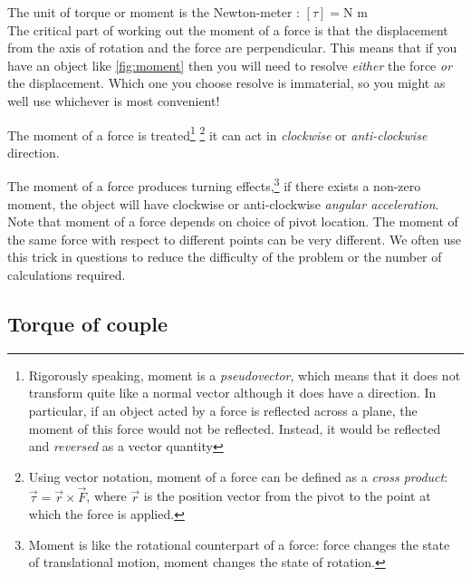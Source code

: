 The unit of torque or moment is the Newton-meter : $[\tau] = \text{N m}$\\

The critical part of working out the moment of a force is that the displacement from the axis of rotation and the force are perpendicular. This means that if you have an object like \ref{fig:moment} then you will need to resolve \emph{either} the force \emph{or} the displacement. Which one you choose resolve is immaterial, so you might as well use whichever is most convenient!\\

The moment of a force is treated\footnote{\piste Rigorously speaking, moment is a \emph{pseudovector}, which means that it does not transform quite like a normal vector although it does have a direction. In particular, if an object acted by a force is reflected across a plane, the moment of this force would not be reflected. Instead, it would be reflected and \emph{reversed} as a vector quantity}
\footnote[][]{\piste Using vector notation, moment of a force can be defined as a \emph{cross product}: $\overrightarrow{\tau} = \overrightarrow{r}\times\overrightarrow{F}$, where $\overrightarrow{r}$ is the position vector from the pivot to the point at which the force is applied.}
it can act in \emph{clockwise} or \emph{anti-clockwise} direction. 

The moment of a force produces turning effects,\footnote{Moment is like the rotational counterpart of a force: force changes the state of translational motion, moment changes the state of rotation.} if there exists a non-zero moment, the object will have clockwise or anti-clockwise \emph{angular acceleration}.\\
\titem Note that moment of a force depends on choice of pivot location. The moment of the same force with respect to different points can be very different. We often use this trick in questions to reduce the difficulty of the problem or the number of calculations required.

\subsection{Torque of couple}\label{ch:torque-of-couple}

